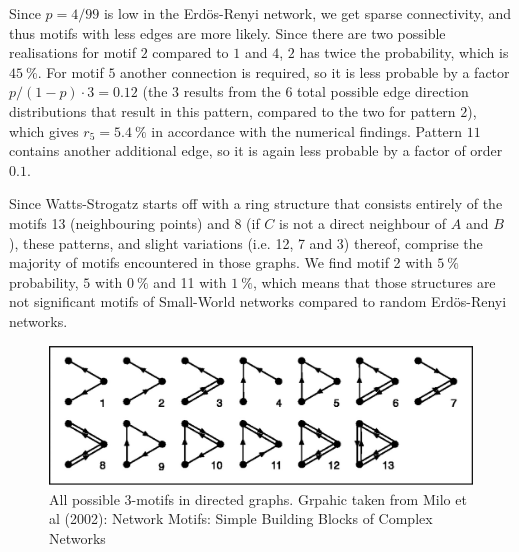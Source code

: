 \documentclass{scrartcl}
\begin{document}
Since $p=4/99$ is low in the Erdös-Renyi network, we get sparse
connectivity, and thus motifs with less edges are more likely. Since there
are two possible realisations for motif $2$ compared to $1$ and $4$, $2$
has twice the probability, which is $\SI{45}{\percent}$. For motif $5$
another connection is required, so it is less probable by a factor
$p/(1-p) \cdot 3 = 0.12$ (the $3$ results from the $6$ total possible edge
direction distributions that result in this pattern, compared to the two
for pattern $2$), which gives $r_5=\SI{5.4}{\percent}$ in accordance with
the numerical findings. Pattern $11$ contains another additional edge, so it is
again less probable by a factor of order $0.1$.

Since Watts-Strogatz starts off with a ring structure that consists
entirely of the motifs 13 (neighbouring points) and 8 (if $C$ is not a direct
neighbour of $A$ and $B$), these patterns, and slight variations (i.e. 12,
7 and 3) thereof,  comprise the majority of motifs encountered in those graphs. We
find motif 2 with $\SI{5}{\percent}$ probability, $5$ with
$\SI{0}{\percent}$ and 11 with $\SI{1}{\percent}$, which means that those
structures are not significant motifs of Small-World networks compared to
random Erdös-Renyi networks.


\begin{figure}
	\centering
		\includegraphics[width=1.00\textwidth]{pictures/motifs.png}
	\caption{All possible 3-motifs in directed graphs. Grpahic taken from {Milo et al (2002): Network Motifs: Simple Building Blocks of Complex Networks}}
	\label{fig:motifs}
\end{figure}
\end{document}
